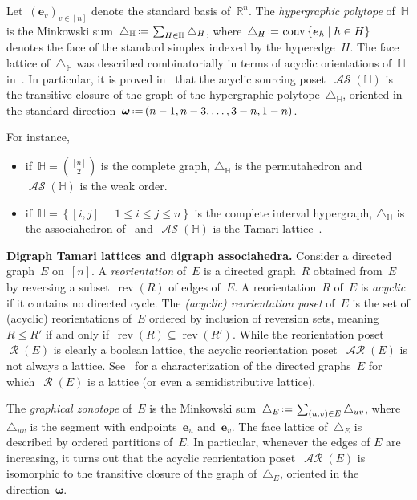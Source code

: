 \documentclass{amsart}
\theoremstyle{definition}
\newcommand{\R}{\mathbb{R}} %
\renewcommand{\b}[1]{\boldsymbol{#1}} %
\renewcommand{\c}[1]{\mathcal{#1}} %
\newcommand{\set}[2]{\left\{ #1 \;\middle|\; #2 \right\}} %
\newcommand{\eqdef}{\mbox{\,\raisebox{0.2ex}{\scriptsize\ensuremath{\mathrm:}}\ensuremath{=}\,}} %
\newcommand{\simplex}{\triangle} %
\DeclareMathOperator{\conv}{conv} %
\newcommand{\para}[1]{\bigskip\noindent\textbf{#1}} %
\newcommand{\darkblue}{\color{darkblue}} %
\newcommand{\defn}[1]{\textsl{\darkblue #1}} %
\DeclareMathOperator{\Reori}{\c{R}}  %
\DeclareMathOperator{\AReori}{\c{AR}}  %
\DeclareMathOperator{\rev}{rev} %
\DeclareMathOperator{\ASour}{\mathcal{AS}}  %
\newcommand{\HH}{\mathbb H}  %
\begin{document}
Let~$(\b{e}_v)_{v \in [n]}$ denote the standard basis of~$\R^n$.
The \defn{hypergraphic polytope} of~$\HH$ is the Minkowski sum~$\simplex_\HH \eqdef \sum_{H \in \HH} \simplex_H$, where~$\simplex_H \eqdef \conv\set{\b{e}_h}{h \in H}$ denotes the face of the standard simplex indexed by the hyperedge~$H$.
The face lattice of~$\simplex_\HH$ was described combinatorially in terms of acyclic orientations of~$\HH$ in~\cite{BenedettiBergeronMachacek}.
In particular, it is proved in~\cite{Gelinas} that the acyclic sourcing poset~$\ASour(\HH)$ is the transitive closure of the graph of the hypergraphic polytope~$\simplex_\HH$, oriented in the standard direction~$\b{\omega} \eqdef (n-1, n-3, \dots, 3-n, 1-n)$.

For instance, 
\begin{itemize}
\item if~$\HH = \binom{[n]}{2}$ is the complete graph, $\simplex_\HH$ is the permutahedron and $\ASour(\HH)$ is the weak order.
\item if~$\HH = \set{[i,j]}{1 \le i \le j \le n}$ is the complete interval hypergraph, $\simplex_\HH$ is the associahedron of~\cite{ShniderSternberg,Loday} and~$\ASour(\HH)$ is the Tamari lattice~\cite{Tamari}.
\end{itemize}


\para{Digraph Tamari lattices and digraph associahedra.}
Consider a directed graph~$E$ on~$[n]$.
A \defn{reorientation} of~$E$ is a directed graph~$R$ obtained from~$E$ by reversing a subset~$\rev(R)$ of edges of~$E$.
A reorientation~$R$ of~$E$ is \defn{acyclic} if it contains no directed cycle.
The \defn{(acyclic) reorientation poset} of~$E$ is the set of (acyclic) reorientations of~$E$ ordered by inclusion of reversion sets, meaning~$R \le R'$ if and only if~$\rev(R) \subseteq \rev(R')$.
While the reorientation poset~$\Reori(E)$ is clearly a boolean lattice, the acyclic reorientation poset~$\AReori(E)$ is not always a lattice.
See~\cite{Pilaud-acyclicReorientationLattices} for a characterization of the directed graphs~$E$ for which~$\Reori(E)$ is a lattice (or even a semidistributive lattice).

The \defn{graphical zonotope} of~$E$ is the Minkowski sum~$\simplex_E \eqdef \sum_{(u,v) \in E} \simplex_{uv}$, where~$\simplex_{uv}$ is the segment with endpoints~$\b{e}_u$ and~$\b{e}_v$.
The face lattice of~$\simplex_E$ is described by ordered partitions of~$E$.
In particular, whenever the edges of $E$ are increasing, it turns out that the acyclic reorientation poset~$\AReori(E)$ is isomorphic to the transitive closure of the graph of~$\simplex_E$, oriented in the direction~$\b{\omega}$.
\end{document}
